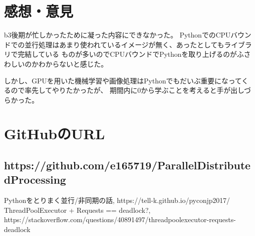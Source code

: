 \documentclass[14pt, oneside]{article}     	%
\begin{document}
\section{感想・意見}
b3後期が忙しかったために凝った内容にできなかった。
PythonでのCPUバウンドでの並行処理はあまり使われているイメージが無く、あったとしてもライブラリで完結している
ものが多いのでCPUバウンドでPythonを取り上げるのがふさわしいのかわからないと感じた。

しかし、GPUを用いた機械学習や画像処理はPythonでもだいぶ重要になってくるので率先してやりたかったが、
期間内に0から学ぶことを考えると手が出しづらかった。
\section{GitHubのURL}
\subsection*{https://github.com/e165719/ParallelDistributedProcessing}
\begin{thebibliography}{9}
   Pythonをとりまく並行/非同期の話,  https://tell-k.github.io/pyconjp2017/
   ThreadPoolExecutor + Requests == deadlock?,  https://stackoverflow.com/questions/40891497/threadpoolexecutor-requests-deadlock
\end{thebibliography}
\end{document}
